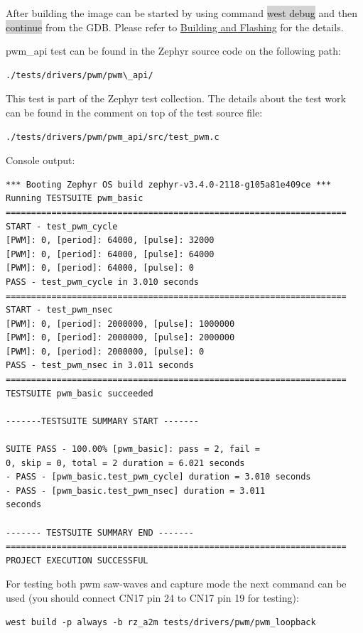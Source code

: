 \documentclass[11pt,a4paper,oneside]{article}
\begin{document}
After building the image can be started by using command \colorbox{lightgray}{west debug}
and then \colorbox{lightgray}{continue} from the GDB. Please refer to
\hyperref[building-and-flashing]{Building and Flashing} for the
details.

pwm\_api test can be found in the Zephyr source code on the following
path:

\begin{lstlisting}
./tests/drivers/pwm/pwm\_api/
\end{lstlisting}

This test is part of the Zephyr test collection. The details about the
test work can be found in the comment on top of the test source file:

\begin{lstlisting}
./tests/drivers/pwm/pwm_api/src/test_pwm.c
\end{lstlisting}

Console output:

\begin{lstlisting}
*** Booting Zephyr OS build zephyr-v3.4.0-2118-g105a81e409ce ***
Running TESTSUITE pwm_basic
===================================================================
START - test_pwm_cycle
[PWM]: 0, [period]: 64000, [pulse]: 32000
[PWM]: 0, [period]: 64000, [pulse]: 64000
[PWM]: 0, [period]: 64000, [pulse]: 0
PASS - test_pwm_cycle in 3.010 seconds
===================================================================
START - test_pwm_nsec
[PWM]: 0, [period]: 2000000, [pulse]: 1000000
[PWM]: 0, [period]: 2000000, [pulse]: 2000000
[PWM]: 0, [period]: 2000000, [pulse]: 0
PASS - test_pwm_nsec in 3.011 seconds
===================================================================
TESTSUITE pwm_basic succeeded

-------TESTSUITE SUMMARY START -------

SUITE PASS - 100.00% [pwm_basic]: pass = 2, fail =
0, skip = 0, total = 2 duration = 6.021 seconds
- PASS - [pwm_basic.test_pwm_cycle] duration = 3.010 seconds
- PASS - [pwm_basic.test_pwm_nsec] duration = 3.011
seconds

------- TESTSUITE SUMMARY END -------
===================================================================
PROJECT EXECUTION SUCCESSFUL
\end{lstlisting}

For testing both pwm saw-waves and capture mode the next command can be
used (you should connect CN17 pin 24 to CN17 pin 19 for testing):

\begin{lstlisting}
west build -p always -b rz_a2m tests/drivers/pwm/pwm_loopback
\end{lstlisting}
\end{document}
